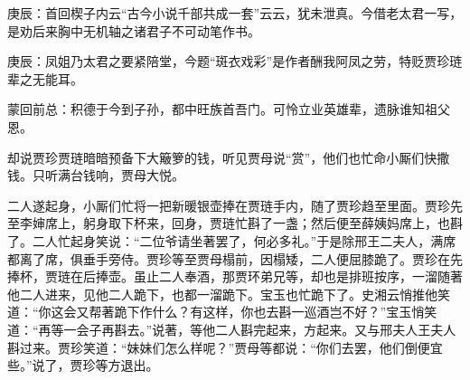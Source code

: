 

\begin{parag}
    \begin{note}庚辰：首回楔子内云“古今小说千部共成一套”云云，犹未泄真。今借老太君一写，是劝后来胸中无机轴之诸君子不可动笔作书。\end{note}
\end{parag}


\begin{parag}
    \begin{note}庚辰：凤姐乃太君之要紧陪堂，今题“斑衣戏彩”是作者酬我阿凤之劳，特贬贾珍琏辈之无能耳。\end{note}
\end{parag}


\begin{parag}
    \begin{note}蒙回前总：积德于今到子孙，都中旺族首吾门。可怜立业英雄辈，遗脉谁知祖父恩。\end{note}
\end{parag}


\begin{parag}
    却说贾珍贾琏暗暗预备下大簸箩的钱，听见贾母说“赏”，他们也忙命小厮们快撒钱。只听满台钱响，贾母大悦。
\end{parag}


\begin{parag}
    二人遂起身，小厮们忙将一把新暖银壶捧在贾琏手内，随了贾珍趋至里面。贾珍先至李婶席上，躬身取下杯来，回身，贾琏忙斟了一盏；然后便至薛姨妈席上，也斟了。二人忙起身笑说：“二位爷请坐著罢了，何必多礼。”于是除邢王二夫人，满席都离了席，俱垂手旁侍。贾珍等至贾母榻前，因榻矮，二人便屈膝跪了。贾珍在先捧杯，贾琏在后捧壶。虽止二人奉酒，那贾环弟兄等，却也是排班按序，一溜随著他二人进来，见他二人跪下，也都一溜跪下。宝玉也忙跪下了。史湘云悄推他笑道：“你这会又帮著跪下作什么？有这样，你也去斟一巡酒岂不好？”宝玉悄笑道：“再等一会子再斟去。”说著，等他二人斟完起来，方起来。又与邢夫人王夫人斟过来。贾珍笑道：“妹妹们怎么样呢？”贾母等都说：“你们去罢，他们倒便宜些。”说了，贾珍等方退出。
\end{parag}


